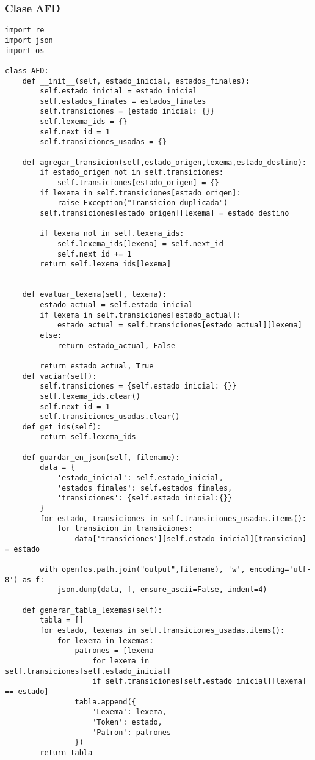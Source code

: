 \documentclass[12pt,a4paper]{article}
\begin{document}
\subsubsection{Clase AFD}

\begin{verbatim}
import re
import json
import os

class AFD:
    def __init__(self, estado_inicial, estados_finales):
        self.estado_inicial = estado_inicial
        self.estados_finales = estados_finales
        self.transiciones = {estado_inicial: {}}
        self.lexema_ids = {}
        self.next_id = 1
        self.transiciones_usadas = {}  
        
    def agregar_transicion(self,estado_origen,lexema,estado_destino):
        if estado_origen not in self.transiciones:
            self.transiciones[estado_origen] = {}
        if lexema in self.transiciones[estado_origen]:
            raise Exception("Transicion duplicada")
        self.transiciones[estado_origen][lexema] = estado_destino
        
        if lexema not in self.lexema_ids:
            self.lexema_ids[lexema] = self.next_id
            self.next_id += 1
        return self.lexema_ids[lexema]


    def evaluar_lexema(self, lexema):
        estado_actual = self.estado_inicial
        if lexema in self.transiciones[estado_actual]:
            estado_actual = self.transiciones[estado_actual][lexema]
        else:
            return estado_actual, False

        return estado_actual, True
    def vaciar(self):
        self.transiciones = {self.estado_inicial: {}}
        self.lexema_ids.clear()  
        self.next_id = 1
        self.transiciones_usadas.clear()    
    def get_ids(self):
        return self.lexema_ids

    def guardar_en_json(self, filename):
        data = {
            'estado_inicial': self.estado_inicial,
            'estados_finales': self.estados_finales,
            'transiciones': {self.estado_inicial:{}}
        }
        for estado, transiciones in self.transiciones_usadas.items():
            for transicion in transiciones:
                data['transiciones'][self.estado_inicial][transicion] = estado  
                                    
        with open(os.path.join("output",filename), 'w', encoding='utf-8') as f:
            json.dump(data, f, ensure_ascii=False, indent=4)
        
    def generar_tabla_lexemas(self):
        tabla = []
        for estado, lexemas in self.transiciones_usadas.items():
            for lexema in lexemas:
                patrones = [lexema 
                    for lexema in self.transiciones[self.estado_inicial] 
                    if self.transiciones[self.estado_inicial][lexema] == estado]
                tabla.append({
                    'Lexema': lexema,
                    'Token': estado,
                    'Patron': patrones
                })
        return tabla
\end{verbatim}
\end{document}
